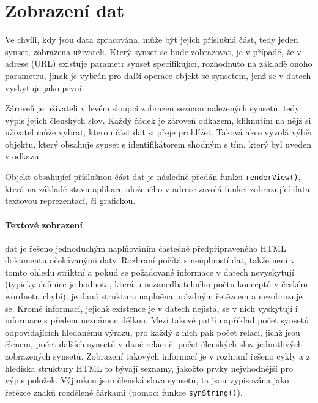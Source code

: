 \documentclass[a4paper, 11pt, oneside]{book}
\begin{document}
			\section{Zobrazení dat}

				Ve chvíli, kdy jsou data zpracována, může být jejich příslušná část, tedy jeden synset, zobrazena uživateli. Který synset se bude zobrazovat, je v případě, že v adrese (URL) existuje parametr synset specifikující, rozhodnuto na základě onoho parametru, jinak je vybrán pro další operace objekt se synsetem, jenž se v datech vyskytuje jako první. 

				Zároveň je uživateli v levém sloupci zobrazen seznam nalezených synsetů, tedy výpis jejich členských slov. Každý řádek je zároveň odkazem, kliknutím na nějž si uživatel může vybrat, kterou část dat si přeje prohlížet. Taková akce vyvolá výběr objektu, který obsahuje synset s identifikátorem shodným s tím, který byl uveden v odkazu.

				Objekt obsahující příslušnou část dat je následně předán funkci \texttt{renderView()}, která na základě stavu aplikace uloženého v adrese zavolá funkci zobrazující data textovou reprezentací, či grafickou.

				\paragraph{Textové zobrazení} dat je řešeno jednoduchým naplňováním částečně předpřipraveného HTML dokumentu očekávanými daty. Rozhraní počítá s neúplností dat, takže není v tomto ohledu striktní a pokud se požadované informace v datech nevyskytují (typicky definice je hodnota, která u nezanedbatelného počtu konceptů v českém wordnetu chybí), je daná struktura naplněna prázdným řetězcem a nezobrazuje se. Kromě informací, jejichž existence je v datech nejistá, se v nich vyskytují i informace s předem neznámou délkou. Mezi takové patří například počet synsetů odpovídajících hledanému výrazu, pro každý z nich pak počet relací, jichž jsou členem, počet dalších synsetů v dané relaci či počet členských slov jednotlivých zobrazených synsetů. Zobrazení takových informací je v rozhraní řešeno cykly a z hlediska struktury HTML to bývají seznamy, jakožto prvky nejvhodnější pro výpis položek. Výjimkou jsou členská slova synsetů, ta jsou vypisována jako řetězce znaků rozdělené čárkami (pomocí funkce \texttt{synString()}).
\end{document}
